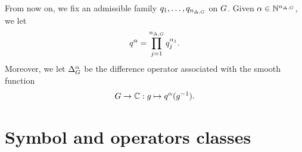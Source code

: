 \begin{remark}
    From now on, we fix an admissible family $q_1, \dots, q_{{n_{\Delta, G}}}$ on $G$.
    Given $\alpha \in \mathbb{N}^{{n_{\Delta, G}}}$, we let
    \begin{align*}
        q^\alpha = \prod_{j = 1}^{{n_{\Delta, G}}} q_j^{\alpha_j}.
    \end{align*}
    Moreover, we let ${\Delta_{G}^{\alpha}}$ be the difference operator associated with the smooth function
    \begin{align*}
        G \to \mathbb{C} : g \mapsto q^\alpha(g^{-1}).
    \end{align*}
\end{remark}

\section{Symbol and operators classes}

